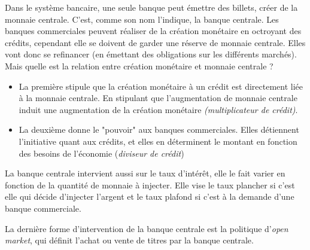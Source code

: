 Dans le système bancaire, une seule banque peut émettre des billets, créer de la monnaie centrale. C'est, comme son nom l'indique, la banque centrale. 
Les banques commerciales peuvent réaliser de la création monétaire en octroyant des crédits, cependant elle se doivent de garder une réserve de monnaie
centrale. Elles vont donc se refinancer (en émettant des obligations sur les différents marchés). Mais quelle est la relation entre création monétaire
et monnaie centrale ? 
\begin{itemize}
	\item La première stipule que la création monétaire à un crédit est directement liée à la monnaie centrale. En stipulant que l'augmentation de monnaie centrale induit une augmentation de la création monétaire \emph{(multiplicateur de crédit)}.
	\item La deuxième donne le "pouvoir" aux banques commerciales. Elles détiennent l'initiative quant aux crédits, et elles en déterminent le montant
	en fonction des besoins de l'économie (\emph{diviseur de crédit}) 
\end{itemize}

La banque centrale intervient aussi sur le taux d'intérêt, elle le fait varier en fonction de la quantité de monnaie à injecter. Elle vise le taux plancher si c'est elle qui décide d'injecter l'argent et le taux plafond si c'est à la demande d'une banque commerciale. 

La dernière forme d'intervention de la banque centrale est la politique d'\emph{open market}, qui définit l'achat ou vente de titres par la banque centrale.




